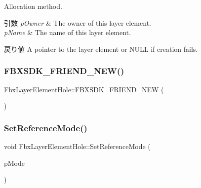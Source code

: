 Allocation method. 
\begin{DoxyParams}{引数}
{\em p\+Owner} & The owner of this layer element. \\
\hline
{\em p\+Name} & The name of this layer element. \\
\hline
\end{DoxyParams}
\begin{DoxyReturn}{戻り値}
A pointer to the layer element or {\ttfamily N\+U\+LL} if creation fails. 
\end{DoxyReturn}
\mbox{\label{class_fbx_layer_element_hole_a7180216993dbbb96cb3edbe3d2db5fa4}} 
\subsubsection{\texorpdfstring{F\+B\+X\+S\+D\+K\+\_\+\+F\+R\+I\+E\+N\+D\+\_\+\+N\+E\+W()}{FBXSDK\_FRIEND\_NEW()}}
{\footnotesize\ttfamily Fbx\+Layer\+Element\+Hole\+::\+F\+B\+X\+S\+D\+K\+\_\+\+F\+R\+I\+E\+N\+D\+\_\+\+N\+EW (\begin{DoxyParamCaption}{ }\end{DoxyParamCaption})}

\mbox{\label{class_fbx_layer_element_hole_a496cc8811acb175197b76226f118149c}} 
\subsubsection{\texorpdfstring{Set\+Reference\+Mode()}{SetReferenceMode()}}
{\footnotesize\ttfamily void Fbx\+Layer\+Element\+Hole\+::\+Set\+Reference\+Mode (\begin{DoxyParamCaption}\item[{\hyperlink{class_fbx_layer_element_a00f04654580ca9b2f5d292c11abd83fc}{Fbx\+Layer\+Element\+::\+E\+Reference\+Mode}}]{p\+Mode }\end{DoxyParamCaption})}


